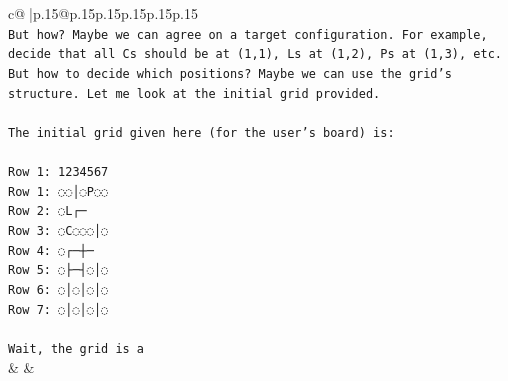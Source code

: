 \documentclass{article}
\begin{document}
{\begin{supertabular}{c@{$\;$}|p{.15\linewidth}@{}p{.15\linewidth}p{.15\linewidth}p{.15\linewidth}p{.15\linewidth}p{.15\linewidth}}
{{{\\ 
\texttt{But how? Maybe we can agree on a target configuration. For example, decide that all Cs should be at (1,1), Ls at (1,2), Ps at (1,3), etc. But how to decide which positions? Maybe we can use the grid's structure. Let me look at the initial grid provided.} \\
\\ 
\texttt{The initial grid given here (for the user's board) is:} \\
\\ 
\texttt{Row 1: 1234567} \\
\texttt{Row 1: ◌◌│◌P◌◌} \\
\texttt{Row 2: ◌L┌─} \\
\texttt{Row 3: ◌C◌◌◌│◌} \\
\texttt{Row 4: ◌┌─┼─} \\
\texttt{Row 5: ◌├─┤◌│◌} \\
\texttt{Row 6: ◌│◌│◌│◌} \\
\texttt{Row 7: ◌│◌│◌│◌} \\
\\ 
\texttt{Wait, the grid is a} \\
            }
        }
    }
    & & \\ \\


\end{supertabular}}
\end{document}
